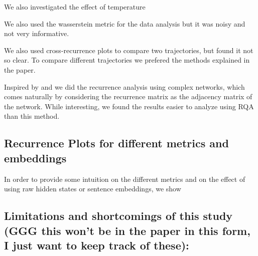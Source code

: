 \documentclass[a4paper,12pt]{article}
\begin{document}
\begin{itemize}
We also investigated the effect of temperature

We also used the wasserstein metric for the data analysis but it was noisy and not very informative.

We also used cross-recurrence plots to compare two trajectories, but found it not so clear. To compare different trajectories we prefered the methods explained in the paper.

Inspired by \cite{DONNER_2011} and \cite{Donner_2010} \cite{ZOU20191} we did the recurrence analysis using complex networks, which comes naturally by considering the recurrence matrix as the adjacency matrix of the network. While interesting, we found the results easier to analyze using RQA than this method. %

\subsection{Recurrence Plots for different metrics and embeddings} %

In order to provide some intuition on the different metrics and on the effect of using raw hidden states or sentence embeddings, we show 


\subsection{Limitations and shortcomings of this study (GGG this won't be in the paper in this form, I just want to keep track of these):}
\label{subsec:appendix_limitations}


\end{itemize}
\end{document}
